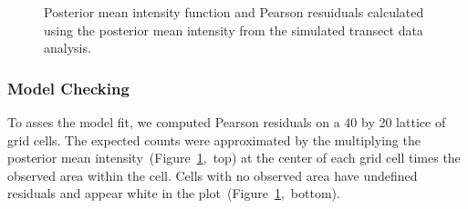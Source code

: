 \documentclass[]{interact}
\begin{document}
\begin{figure}[p]


\caption{Posterior mean intensity function and Pearson resuiduals calculated
using the posterior mean intensity from the simulated transect data analysis.}
\label{effortintensity}
\end{figure}


\subsubsection{Model Checking}
\label{effortresid}

To asses the model fit, we computed Pearson residuals on a 40 by 20 lattice of
grid cells. The expected counts were approximated by the multiplying the
posterior mean intensity~(Figure~\ref{effortintensity},~top) at the center of
each grid cell times the observed area within the cell. Cells with no observed
area have undefined residuals and appear white in the
plot~(Figure~\ref{effortintensity},~bottom).
\end{document}
